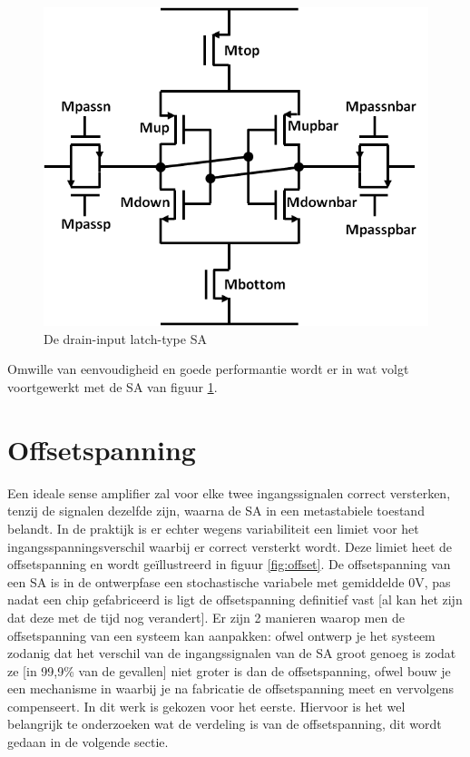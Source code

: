 \begin{figure}
  \centering
  \includegraphics[scale=0.4]{../fig/hfdstk-sensamp-ourSA.png}
  \caption{De drain-input latch-type SA}
  \label{fig:ourSA}
\end{figure}

Omwille van eenvoudigheid en goede performantie\cite{Cos09} wordt er in wat volgt voortgewerkt met de SA van figuur \ref{fig:ourSA}.


\section{Offsetspanning}
Een ideale sense amplifier zal voor elke twee ingangssignalen correct versterken, tenzij de signalen dezelfde zijn, waarna de SA in een metastabiele toestand belandt. In de praktijk is er echter wegens variabiliteit een limiet voor het ingangsspanningsverschil waarbij er correct versterkt wordt. Deze limiet heet de offsetspanning en wordt geïllustreerd in figuur \ref{fig:offset}. De offsetspanning van een SA is in de ontwerpfase een stochastische variabele met gemiddelde 0V, pas nadat een chip gefabriceerd is ligt de offsetspanning definitief vast [al kan het zijn dat deze met de tijd nog verandert].
Er zijn 2 manieren waarop men de offsetspanning van een systeem kan aanpakken: ofwel ontwerp je het systeem zodanig dat het verschil van de ingangssignalen van de SA groot genoeg is zodat ze [in 99,9\% van de gevallen] niet groter is dan de offsetspanning, ofwel bouw je een mechanisme in waarbij je na fabricatie de offsetspanning meet en vervolgens compenseert. In dit werk is gekozen voor het eerste.
Hiervoor is het wel belangrijk te onderzoeken wat de verdeling is van de offsetspanning, dit wordt gedaan in de volgende sectie.

